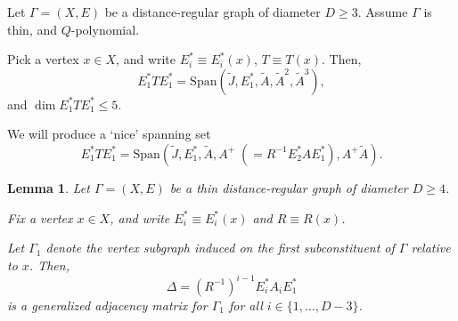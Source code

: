 \documentclass[
]{book}
\newtheorem{lemma}{Lemma}[chapter]
\theoremstyle{definition}
\theoremstyle{definition}
\theoremstyle{definition}
\theoremstyle{definition}
\theoremstyle{remark}
\begin{document}
Let \(\Gamma = (X, E)\) be a distance-regular graph of diameter \(D\geq 3\). Assume \(\Gamma\) is thin, and \(Q\)-polynomial.

Pick a vertex \(x\in X\), and write \(E^*_i \equiv E^*_i(x)\), \(T\equiv T(x)\). Then,
\[E^*_1TE^*_1 = \mathrm{Span}(\tilde{J}, E^*_1, \tilde{A}, \tilde{A}^2, \tilde{A}^3),\]
and \(\dim E^*_1TE^*_1\leq 5\).

We will produce a `nice' spanning set
\[E^*_1TE^*_1 = \mathrm{Span}(\tilde{J}, E^*_1, \tilde{A}, A^+ \;(= R^{-1}E^*_2AE^*_1), A^+\tilde{A}).\]

\begin{lemma}
\protect\hypertarget{lem:generalized-adjacecy-matrix}{}\label{lem:generalized-adjacecy-matrix}Let \(\Gamma = (X, E)\) be a thin distance-regular graph of diameter \(D\geq 4\).

Fix a vertex \(x\in X\), and write \(E^*_i \equiv E^*_i(x)\) and \(R \equiv R(x)\).

Let \(\Gamma_1\) denote the vertex subgraph induced on the first subconstituent of \(\Gamma\) relative to \(x\). Then,
\[\Delta = (R^{-1})^{i-1}E^*_iA_iE^*_1\]
is a generalized adjacency matrix for \(\Gamma_1\) for all \(i\in \{1, \ldots, D-3\}\).
\end{lemma}
\end{document}
